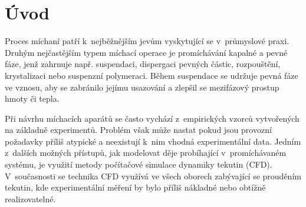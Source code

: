 \chapter{Úvod}
Proces míchaní patří k~nejběžnějším jevům vyskytující se v~průmyslové praxi. Druhým nejčastějším typem míchací operace je promíchávání kapalné a pevné fáze, jenž zahrnuje např. suspendaci, dispergaci pevných částic, rozpouštění, krystalizaci nebo suspenzní polymeraci. Během suspendace se udržuje pevná fáze ve vznosu, aby se zabránilo jejímu usazování a zlepšil se mezifázový prostup hmoty či tepla. 

Při návrhu míchacích aparátů se často vychází z~empirických vzorců vytvořených na základně experimentů. Problém však může nastat pokud jsou provozní požadavky příliš atypické a neexistují k~nim vhodná experimentální data. Jedním z~dalších možných přístupů, jak modelovat děje probíhající v~promíchávaném systému, je využití metody počítačové simulace dynamiky tekutin (CFD). V~současnosti se technika CFD využívá ve všech oborech zabývající se prouděním tekutin, kde experimentální měření by bylo příliš nákladné nebo obtížně realizovatelné.   
